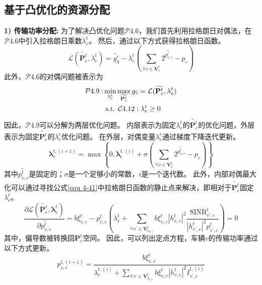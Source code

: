 \subsection{基于凸优化的资源分配}
\textbf{1) 传输功率分配:} 为了解决凸优化问题$\mathcal{P}4.6$，我们首先利用拉格朗日对偶法\cite{boyd2004convex}，在$\mathcal{P}4.6$中引入拉格朗日乘数$\lambda_{e}^{t}$。
然后，通过以下方式获得拉格朗日函数。
\begin{equation}
	\mathcal{L}(\widetilde{\mathbf{{P}}_{e}^{t}}, {\lambda}_{e}^{t} ) = \widetilde{g_3^{e}} -  {\lambda}_{e}^{t} (\sum_{\forall v \in \mathbf{V}_{e}^{t}} 2^{\widetilde{p_{v, e}^{t}}} - p_{e} )
	\label{equ 4-41}
\end{equation}
此外，$\mathcal{P}4.6$的对偶问题被表示为
\begin{align}
	\mathcal{P}4.9: & \min_{{\lambda}_{e}^{t}} \max_{\widetilde{\mathbf{{P}}_{e}^{t}}}  g_5 = \mathcal{L}(\widetilde{\mathbf{{P}}_{e}^{t}}, {\lambda}_{e}^{t} ) \notag \\
	&\text { s.t. } \mathcal{C}4.12: \mathbf{\lambda}_{e}^{t} \geq 0  
\end{align}
因此，$\mathcal{P}4.9$可以分解为两层优化问题。
内层表示为固定${\lambda}_{e}^{t}$的$\widetilde{\mathbf{{P}}_{e}^{t}}$的优化问题，外层表示为固定$\widetilde{\mathbf{{P}}_{e}^{t}}$的${\lambda}_{e}^{t}$优化问题。
在外层，对偶变量${\lambda}_{e}^{t}$通过梯度下降迭代更新。
\begin{equation}
	\mathbf{\lambda}_{e}^{t, (i+1)} = \max\left\{0, \mathbf{\lambda}_{e}^{t, (i)} + \sigma (\sum_{\forall v \in \mathbf{V}_{e}^{t}} 2^{\widetilde{p_{v, e}^{t}}} - p_{e} )\right\}
\end{equation}
其中$\widetilde{p_{v, e}^{t}}$是固定的；$\sigma$是一个足够小的常数，$i$是一个迭代数。
此外，内部对偶最大化可以通过寻找公式\ref{equ 4-41}中拉格朗日函数的静止点来解决，即相对于$\widetilde{\mathbf{{P}}_{e}^{t}}$固定${\lambda}_{e}^{t}$。
\begin{equation}
\frac{\partial \mathcal{L}\left(\widetilde{\mathbf{{P}}_{e}^{t}}, \mathbf{\lambda}_{e}^{t} \right)}{\partial \widetilde{p_{v, e}^{t}}}= b  \xi_{v, e}^{t}  - p_{v, e}^{t}(\lambda_{e}^{t} +\sum\limits_{\forall v^{\prime} \in \mathbf{V}_{h_{v, e}}^{t}} b  \xi_{v, e}^{t} |h_{v, e}^t|^2 \frac{\mathrm{SINR}_{v^{\prime}, e}^t}{|h_{v^{\prime}, e}^t| ^{2} p_{v^{\prime}, e}^{t}}) =0
\end{equation}
其中，偏导数被转换回$\mathbf{P}_{e}^{t}$空间。
因此，可以列出定点方程，车辆$v$的传输功率通过以下方式更新。
\begin{equation}
p_{v, e}^{t, {(i+1)}}=\frac{b \xi_{v, e}^{t}}{\lambda_{e}^{t,(i)}+\sum\limits_{\forall v^{\prime} \in \mathbf{V}_{h_{v, e}}^{t}} b  \xi_{v, e}^{t}|h_{v, e}^t|^2 {I}_{v^{\prime}, e}^{t, (i)} }
\end{equation}
